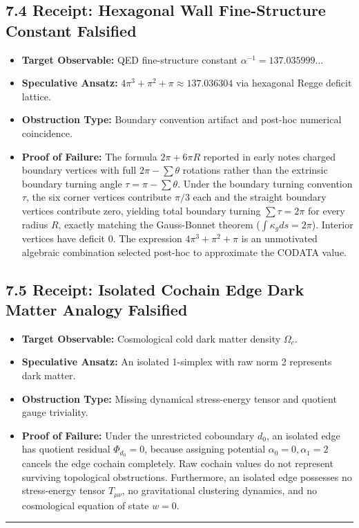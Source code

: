 \documentclass[11pt]{article}
\begin{document}
\subsection{\texorpdfstring{7.4 Receipt: Hexagonal Wall Fine-Structure Constant Falsified}{7.4 Receipt: Hexagonal Wall Fine-Structure Constant Falsified}}

\begin{itemize}[leftmargin=1.4em,itemsep=0.2em]
\item \textbf{Target Observable:} QED fine-structure constant $\alpha^{-1} = 137.035999...$
\item \textbf{Speculative Ansatz:} $4\pi^3 + \pi^2 + \pi \approx 137.036304$ via hexagonal Regge deficit lattice.
\item \textbf{Obstruction Type:} Boundary convention artifact and post-hoc numerical coincidence.
\item \textbf{Proof of Failure:} The formula $2\pi + 6\pi R$ reported in early notes charged boundary vertices with full $2\pi - \sum \theta$ rotations rather than the extrinsic boundary turning angle $\tau = \pi - \sum \theta$. Under the boundary turning convention $\tau$, the six corner vertices contribute $\pi/3$ each and the straight boundary vertices contribute zero, yielding total boundary turning $\sum \tau = 2\pi$ for every radius $R$, exactly matching the Gauss-Bonnet theorem ($\int \kappa_g ds = 2\pi$). Interior vertices have deficit 0. The expression $4\pi^3 + \pi^2 + \pi$ is an unmotivated algebraic combination selected post-hoc to approximate the CODATA value.
\end{itemize}
\subsection{\texorpdfstring{7.5 Receipt: Isolated Cochain Edge Dark Matter Analogy Falsified}{7.5 Receipt: Isolated Cochain Edge Dark Matter Analogy Falsified}}

\begin{itemize}[leftmargin=1.4em,itemsep=0.2em]
\item \textbf{Target Observable:} Cosmological cold dark matter density $\Omega_c$.
\item \textbf{Speculative Ansatz:} An isolated 1-simplex with raw norm 2 represents dark matter.
\item \textbf{Obstruction Type:} Missing dynamical stress-energy tensor and quotient gauge triviality.
\item \textbf{Proof of Failure:} Under the unrestricted coboundary $d_0$, an isolated edge has quotient residual $\Phi_{d_0} = 0$, because assigning potential $\alpha_0 = 0, \alpha_1 = 2$ cancels the edge cochain completely. Raw cochain values do not represent surviving topological obstructions. Furthermore, an isolated edge possesses no stress-energy tensor $T_{\mu\nu}$, no gravitational clustering dynamics, and no cosmological equation of state $w = 0$.
\end{itemize}
\medskip\hrule\medskip
\end{document}

